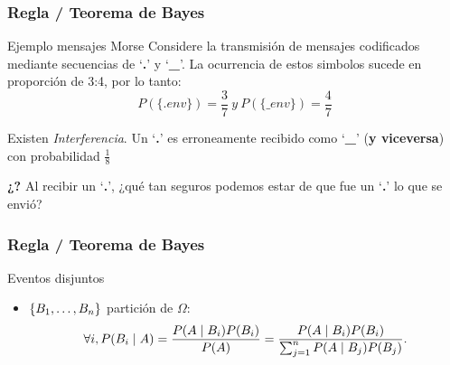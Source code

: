 \documentclass[table]{beamer}
\begin{document}
\begin{frame}
    \frametitle{Regla / Teorema de Bayes}
    \begin{block}{Ejemplo mensajes Morse}
		Considere la transmisión de mensajes codificados mediante secuencias de `\textbf{.}' y `\textbf{\_}'. La ocurrencia de estos simbolos sucede en proporción de 3:4, por lo tanto:
$$P(\{. env\})=\frac{3}{7}\ y\ P(\{\_ env\})=\frac{4}{7} $$

Existen \textit{Interferencia}. Un `\textbf{.}' es erroneamente recibido como `\textbf{\_}' (\textbf{y viceversa}) con probabilidad $\frac{1}{8}$


\textbf{¿?} Al recibir un `\textbf{.}', ¿qué tan seguros podemos estar de que fue un `\textbf{.}' lo que se envió?
    \end{block}
\end{frame}

\begin{frame}

\end{frame}


\begin{frame}
\frametitle{Regla / Teorema de Bayes}

\begin{block}{Eventos disjuntos}
        \begin{itemize}
            \item $\bparens{B_{1}, \ldots, B_{n}}$ partición de $\Omega$:
                \begin{equation*}
                    \forall i, \prob{B_{i} \mid A} = \frac{\prob{A \mid B_{i}} \prob{B_{i}}}{\prob{A}}
                    =
                    \frac{\prob{A \mid B_{i}} \prob{B_{i}}}{\sum_{j = 1}^{n} \prob{A \mid B_{j}} \prob{B_{j}}} .
                \end{equation*}
        \end{itemize}
    \end{block}
\end{frame}
\end{document}
